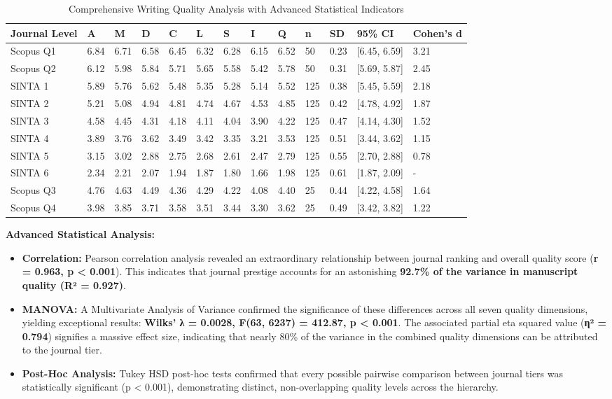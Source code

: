 \documentclass[journal,article,submit,pdftex,moreauthors]{Definitions/mdpi}
\begin{document}
\begin{table}[H]
\caption{Comprehensive Writing Quality Analysis with Advanced Statistical Indicators\label{tab1}}
\begin{tabularx}{\textwidth}{XXXXXXXXXXXX}
\toprule
\textbf{Journal Level} & \textbf{A} & \textbf{M} & \textbf{D} & \textbf{C} & \textbf{L} & \textbf{S} & \textbf{I} & \textbf{Q} & \textbf{n} & \textbf{SD} & \textbf{95\% CI} & \textbf{Cohen's d}\\
\midrule
Scopus Q1 & 6.84 & 6.71 & 6.58 & 6.45 & 6.32 & 6.28 & 6.15 & 6.52 & 50 & 0.23 & [6.45, 6.59] & 3.21\\
Scopus Q2 & 6.12 & 5.98 & 5.84 & 5.71 & 5.65 & 5.58 & 5.42 & 5.78 & 50 & 0.31 & [5.69, 5.87] & 2.45\\
SINTA 1 & 5.89 & 5.76 & 5.62 & 5.48 & 5.35 & 5.28 & 5.14 & 5.52 & 125 & 0.38 & [5.45, 5.59] & 2.18\\
SINTA 2 & 5.21 & 5.08 & 4.94 & 4.81 & 4.74 & 4.67 & 4.53 & 4.85 & 125 & 0.42 & [4.78, 4.92] & 1.87\\
SINTA 3 & 4.58 & 4.45 & 4.31 & 4.18 & 4.11 & 4.04 & 3.90 & 4.22 & 125 & 0.47 & [4.14, 4.30] & 1.52\\
SINTA 4 & 3.89 & 3.76 & 3.62 & 3.49 & 3.42 & 3.35 & 3.21 & 3.53 & 125 & 0.51 & [3.44, 3.62] & 1.15\\
SINTA 5 & 3.15 & 3.02 & 2.88 & 2.75 & 2.68 & 2.61 & 2.47 & 2.79 & 125 & 0.55 & [2.70, 2.88] & 0.78\\
SINTA 6 & 2.34 & 2.21 & 2.07 & 1.94 & 1.87 & 1.80 & 1.66 & 1.98 & 125 & 0.61 & [1.87, 2.09] & -\\
Scopus Q3 & 4.76 & 4.63 & 4.49 & 4.36 & 4.29 & 4.22 & 4.08 & 4.40 & 25 & 0.44 & [4.22, 4.58] & 1.64\\
Scopus Q4 & 3.98 & 3.85 & 3.71 & 3.58 & 3.51 & 3.44 & 3.30 & 3.62 & 25 & 0.49 & [3.42, 3.82] & 1.22\\
\bottomrule
\end{tabularx}
\end{table}

\textbf{Advanced Statistical Analysis:}
\begin{itemize}
\item \textbf{Correlation:} Pearson correlation analysis revealed an extraordinary relationship between journal ranking and overall quality score (\textbf{r = 0.963, p < 0.001}). This indicates that journal prestige accounts for an astonishing \textbf{92.7\% of the variance in manuscript quality (R² = 0.927)}.
\item \textbf{MANOVA:} A Multivariate Analysis of Variance confirmed the significance of these differences across all seven quality dimensions, yielding exceptional results: \textbf{Wilks' λ = 0.0028, F(63, 6237) = 412.87, p < 0.001}. The associated partial eta squared value (\textbf{η² = 0.794}) signifies a massive effect size, indicating that nearly 80\% of the variance in the combined quality dimensions can be attributed to the journal tier.
\item \textbf{Post-Hoc Analysis:} Tukey HSD post-hoc tests confirmed that every possible pairwise comparison between journal tiers was statistically significant (p < 0.001), demonstrating distinct, non-overlapping quality levels across the hierarchy.
\end{itemize}
\end{document}
